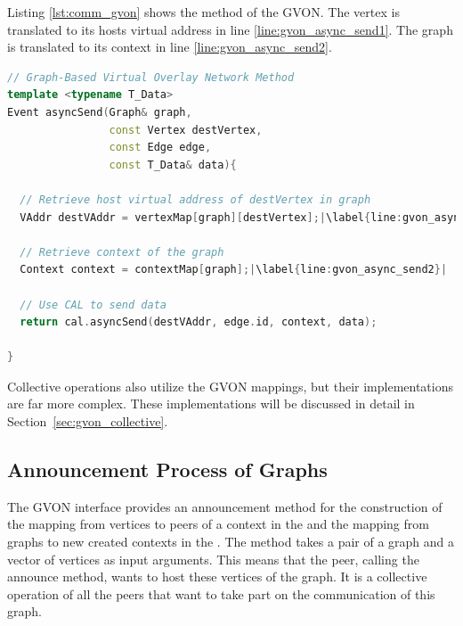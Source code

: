 \noindent Listing \ref{lst:comm_gvon} shows the  method of the
GVON. The vertex is translated to its hosts virtual address in line
\ref{line:gvon_async_send1}. The graph is translated to its context
in line \ref{line:gvon_async_send2}.
\begin{lstlisting}[language=C++, label=lst:comm_gvon,escapechar=|]
// Graph-Based Virtual Overlay Network Method  
template <typename T_Data>
Event asyncSend(Graph& graph, 
                const Vertex destVertex, 
                const Edge edge, 
                const T_Data& data){ 

  // Retrieve host virtual address of destVertex in graph
  VAddr destVAddr = vertexMap[graph][destVertex];|\label{line:gvon_async_send1}|

  // Retrieve context of the graph
  Context context = contextMap[graph];|\label{line:gvon_async_send2}|

  // Use CAL to send data
  return cal.asyncSend(destVAddr, edge.id, context, data);

}
\end{lstlisting}

\noindent Collective operations also utilize the GVON mappings, but their
implementations are far more complex. These implementations will be
discussed in detail in Section~\ref{sec:gvon_collective}.


\subsection{Announcement Process of Graphs}
\label{sec:announcement_impl}

The GVON interface provides an announcement method for the
construction of the mapping from vertices to peers of a context in the
 and the mapping from graphs to new created contexts in the
.  The method takes a pair of a graph and a vector of vertices
as input arguments. This means that the peer, calling the announce
method, wants to host these vertices of the graph.  It is a collective
operation of all the peers that want to take part on the communication
of this graph.

